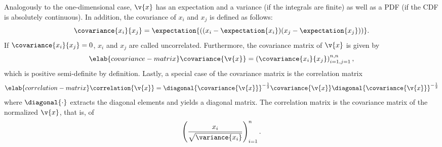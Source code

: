 Analogously to the one-dimensional case, $\v{x}$ has an expectation and a
variance (if the integrals are finite) as well as a \ac{PDF} (if the \ac{CDF} is
absolutely continuous). In addition, the covariance of $x_i$ and $x_j$ is
defined as follows:
\[
  \covariance{x_i}{x_j} = \expectation{((x_i - \expectation{x_i})(x_j - \expectation{x_j}))}.
\]
If $\covariance{x_i}{x_j} = 0$, $x_i$ and $x_j$ are called uncorrelated.
Furthermore, the covariance matrix of $\v{x}$ is given by
\begin{equation} \elab{covariance-matrix}
  \covariance{\v{x}} = \left(\covariance{x_i}{x_j}\right)_{i = 1, j = 1}^{n, n},
\end{equation}
which is positive semi-definite by definition. Lastly, a special case of the
covariance matrix is the correlation matrix
\begin{equation} \elab{correlation-matrix}
  \correlation{\v{x}} = \diagonal{\covariance{\v{x}}}^{-\frac{1}{2}} \covariance{\v{x}} \diagonal{\covariance{\v{x}}}^{-\frac{1}{2}}
\end{equation}
where $\diagonal{\cdot}$ extracts the diagonal elements and yields a diagonal
matrix. The correlation matrix is the covariance matrix of the normalized
$\v{x}$, that is, of
\[
  \left(\frac{x_i}{\sqrt{\variance{x_i}}}\right)_{i = 1}^n.
\]

